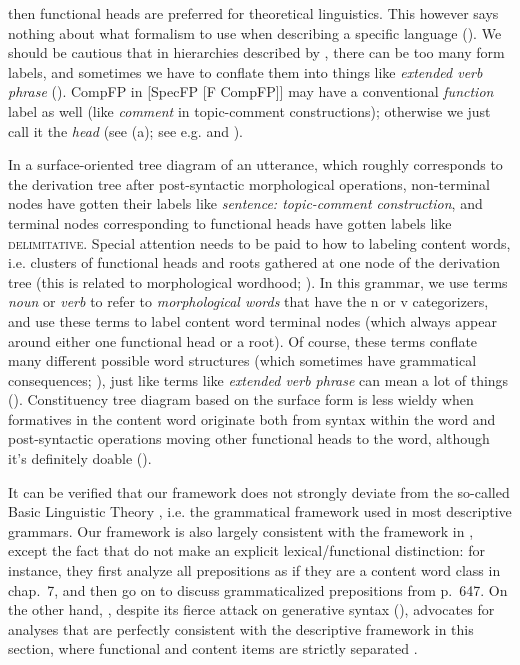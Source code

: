 \documentclass[UTF8, a4paper, oneside, scheme=plain, 12pt]{ctexrep}
\newcommand*{\citechap}[1]{chap.~{#1}}
\newcommand*{\citepage}[1]{p.~{#1}}
\newcommand*{\citepages}[1]{pp.~{#1}}
\newcommand*{\term}[1]{\emph{#1}}
\newcommand{\form}[1]{\emph{#1}}
\newcommand*{\category}[1]{\textsc{#1}}
\begin{document}
{\begin{itemize}
{        then functional heads are preferred for theoretical linguistics.
        This however says nothing about what formalism to use 
        when describing a specific language ().
    }
    We should be cautious that in hierarchies described by \citet{cinque1999adverbs},
    there can be too many form labels,
    and sometimes we have to conflate them into things like \form{extended verb phrase}
    ().
    CompFP in [SpecFP [F CompFP]] may have a conventional \emph{function} label as well
    (like \form{comment} in topic-comment constructions);
    otherwise we just call it the \term{head} (see (a); see e.g.  and ).

    In a surface-oriented tree diagram of an utterance,
    which roughly corresponds to the derivation tree after post-syntactic morphological operations,
    non-terminal nodes have gotten their labels like \term{sentence: topic-comment construction},
    and terminal nodes corresponding to functional heads have gotten labels like \category{delimitative}.
    Special attention needs to be paid to how to labeling content words,
    i.e. clusters of functional heads and roots gathered at one node of the derivation tree
    (this is related to morphological wordhood; ).
    In this grammar, we use terms \term{noun} or \term{verb}
    to refer to \emph{morphological words} that have the n or v categorizers,
    and use these terms to label content word terminal nodes (which always appear around either one functional head or a root).
    Of course, these terms conflate many different possible word structures
    (which sometimes have grammatical consequences; \citealt[\citepages{59-60}]{siddiqi2009syntax}),
    just like terms like \term{extended verb phrase} can mean a lot of things
    ().
    Constituency tree diagram based on the surface form is
    less wieldy when formatives in the content word
    originate both from syntax within the word and post-syntactic operations moving 
    other functional heads to the word,
    although it's definitely doable ().
\end{itemize}

It can be verified that our framework does not strongly deviate from the so-called Basic Linguistic Theory
\citep{dixon2009basic},
i.e. the grammatical framework used in most descriptive grammars.
Our framework is also largely consistent with the framework in \citet{cgel},
except the fact that \citet{cgel} do not make an explicit lexical/functional distinction:
for instance, they first analyze all prepositions as if they are a content word class
in \citechap{7},
and then go on to discuss grammaticalized prepositions from \citepage{647}.
On the other hand, \citet{dixon2009basic}, despite its fierce attack on generative syntax
(),
advocates for analyses that are perfectly consistent with the descriptive framework in this section,
where functional and content items are strictly separated
\citep[\citepage{49}]{dixon2009basic}.

}
\end{document}
